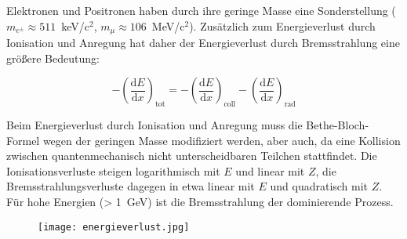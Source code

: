 \FloatBarrier
Elektronen und Positronen haben durch ihre geringe Masse eine Sonderstellung
($m_{e^{\pm}} \approx 511$~keV/c$^2$, $m_{\mu} \approx 106$~MeV/c$^2$). Zusätzlich zum Energieverlust durch Ionisation und
Anregung hat daher der Energieverlust durch Bremsstrahlung eine größere Bedeutung:

\[-\left(\frac{\mathrm{d}E}{\mathrm{d}x}\right)_{\text{tot}} = -\left(\frac{\mathrm{d}E}{\mathrm{d}x}\right)_{\text{coll}}
-\left(\frac{\mathrm{d}E}{\mathrm{d}x}\right)_{\text{rad}} \]

Beim Energieverlust durch Ionisation und Anregung muss die Bethe-Bloch-Formel wegen der geringen
Masse modifiziert werden, aber auch, da eine Kollision zwischen quantenmechanisch nicht
unterscheidbaren Teilchen stattfindet. Die Ionisationsverluste steigen logarithmisch mit $E$ und
linear mit $Z$, die Bremsstrahlungsverluste dagegen in etwa linear mit $E$ und quadratisch mit $Z$.
Für hohe Energien (> 1~GeV) ist die Bremsstrahlung der dominierende Prozess.

\begin{figure}
	\centering
	\texttt{[image: energieverlust.jpg]}
	\caption{}
	\label{}
\end{figure}


\FloatBarrier